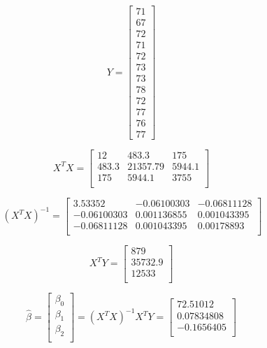 \documentclass[12pt,a4paper, oneside]{extreport}
\begin{document}
\begin{equation}\label{key}
Y=\begin{bmatrix} 
71 \\ 67 \\ 72 \\ 71 \\ 72 \\ 73 \\ 73 \\ 78 \\ 72 \\ 77 \\ 76 \\ 77\end{bmatrix}
\end{equation}

\begin{equation}\label{key}
X^TX=\begin{bmatrix} 
12 & 483.3 & 175 \\ 
483.3 & 21357.79 & 5944.1 \\ 
175 & 5944.1 & 3755 \\ 
\end{bmatrix}
\end{equation}

\begin{equation}\label{key}\
(X^TX)^{-1} = 
\begin{bmatrix} 
3.53352 & -0.06100303 & -0.06811128 \\ 
-0.06100303 & 0.001136855 & 0.001043395 \\ 
-0.06811128 & 0.001043395 & 0.00178893 \\ 
\end{bmatrix}
\end{equation}

\begin{equation}\label{key}
X^TY = \begin{bmatrix} 
879 \\ 
35732.9 \\ 
12533 \\ 
\end{bmatrix}
\end{equation}

\begin{equation}\label{key}
\hat{\beta} = \begin{bmatrix} 
\beta_0 \\ 
\beta_1 \\ 
\beta_2 \\ 
\end{bmatrix}  = (X^TX)^{-1}X^TY = \begin{bmatrix} 
72.51012 \\ 
0.07834808 \\ 
-0.1656405 \\ 
\end{bmatrix}
\end{equation}
\end{document}
